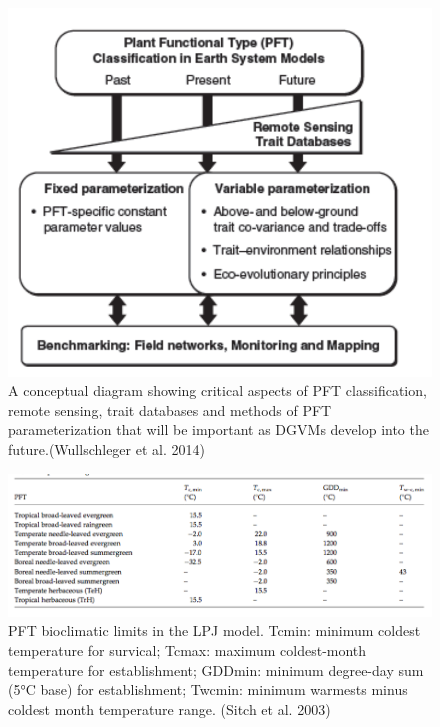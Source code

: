 \documentclass[
  12pt,
  oneside]{book}
\begin{document}
\begin{figure}

{\centering \includegraphics[width=0.8\linewidth]{figures/chap7/f712_pft_wullschleger} 

}

\caption{A conceptual diagram showing critical aspects of PFT classification, remote sensing, trait databases and methods of PFT parameterization that will be important as DGVMs develop into the future.(Wullschleger et al. 2014)}\label{fig:f712}
\end{figure}

\begin{figure}

{\centering \includegraphics[width=0.8\linewidth]{figures/chap7/f713_lpj_bioclim_table} 

}

\caption{PFT bioclimatic limits in the LPJ model. Tcmin: minimum coldest temperature for survical; Tcmax: maximum coldest-month temperature for establishment; GDDmin: minimum degree-day sum (5°C base) for establishment; Twcmin: minimum warmests minus coldest month temperature range. (Sitch et al. 2003)}\label{fig:f713}
\end{figure}
\end{document}
